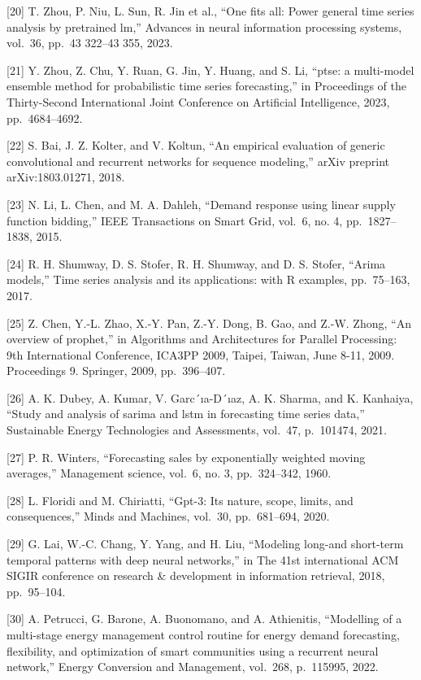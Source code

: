 \documentclass[
  10
]{article}
\begin{document}
{[}20{]} T. Zhou, P. Niu, L. Sun, R. Jin et al., ``One fits all: Power
general time series analysis by pretrained lm,'' Advances in neural
information processing systems, vol.~36, pp.~43 322--43 355, 2023.

{[}21{]} Y. Zhou, Z. Chu, Y. Ruan, G. Jin, Y. Huang, and S. Li, ``ptse:
a multi-model ensemble method for probabilistic time series
forecasting,'' in Proceedings of the Thirty-Second International Joint
Conference on Artificial Intelligence, 2023, pp.~4684--4692.

{[}22{]} S. Bai, J. Z. Kolter, and V. Koltun, ``An empirical evaluation
of generic convolutional and recurrent networks for sequence modeling,''
arXiv preprint arXiv:1803.01271, 2018.

{[}23{]} N. Li, L. Chen, and M. A. Dahleh, ``Demand response using
linear supply function bidding,'' IEEE Transactions on Smart Grid,
vol.~6, no. 4, pp.~1827--1838, 2015.

{[}24{]} R. H. Shumway, D. S. Stofer, R. H. Shumway, and D. S. Stofer,
``Arima models,'' Time series analysis and its applications: with R
examples, pp.~75--163, 2017.

{[}25{]} Z. Chen, Y.-L. Zhao, X.-Y. Pan, Z.-Y. Dong, B. Gao, and Z.-W.
Zhong, ``An overview of prophet,'' in Algorithms and Architectures for
Parallel Processing: 9th International Conference, ICA3PP 2009, Taipei,
Taiwan, June 8-11, 2009. Proceedings 9. Springer, 2009, pp.~396--407.

{[}26{]} A. K. Dubey, A. Kumar, V. Garc´ıa-D´ıaz, A. K. Sharma, and K.
Kanhaiya, ``Study and analysis of sarima and lstm in forecasting time
series data,'' Sustainable Energy Technologies and Assessments, vol.~47,
p.~101474, 2021.

{[}27{]} P. R. Winters, ``Forecasting sales by exponentially weighted
moving averages,'' Management science, vol.~6, no. 3, pp.~324--342,
1960.

{[}28{]} L. Floridi and M. Chiriatti, ``Gpt-3: Its nature, scope,
limits, and consequences,'' Minds and Machines, vol.~30, pp.~681--694,
2020.

{[}29{]} G. Lai, W.-C. Chang, Y. Yang, and H. Liu, ``Modeling long-and
short-term temporal patterns with deep neural networks,'' in The 41st
international ACM SIGIR conference on research \& development in
information retrieval, 2018, pp.~95--104.

{[}30{]} A. Petrucci, G. Barone, A. Buonomano, and A. Athienitis,
``Modelling of a multi-stage energy management control routine for
energy demand forecasting, flexibility, and optimization of smart
communities using a recurrent neural network,'' Energy Conversion and
Management, vol.~268, p.~115995, 2022.
\end{document}
